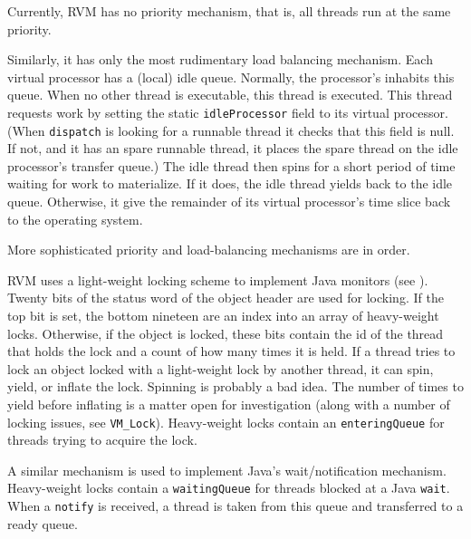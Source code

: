 Currently, RVM has no priority mechanism, that is, all threads run
at the same priority.

Similarly, it has only the most rudimentary load balancing mechanism.
Each virtual processor has a (local) idle queue.  Normally, the
processor's 
inhabits this queue.  When no other
thread is executable, this thread is executed.  This thread requests
work by setting the static {\tt idleProcessor} field to its virtual
processor.  (When {\tt dispatch} is looking for a runnable thread it
checks that this field is null.  If not, and it has an spare runnable
thread, it places the spare thread on the idle processor's transfer
queue.)  The idle thread then spins for a short period of time waiting
for work to materialize.  If it does, the idle thread yields back to
the idle queue.  Otherwise, it give the remainder of its virtual
processor's time slice back to the operating system.

More sophisticated priority and load-balancing mechanisms are in
order.

RVM uses a light-weight locking scheme to implement Java monitors (see
).  Twenty bits of the status word of the object header are
used for locking.  If the top bit is set, the bottom nineteen are an
index into an array of heavy-weight locks.  Otherwise, if the object
is locked, these bits contain the id of the thread that holds the lock
and a count of how many times it is held.  If a thread tries to lock
an object locked with a light-weight lock by another thread, it can
spin, yield, or inflate the lock.  Spinning is probably a bad idea.
The number of times to yield before inflating is a matter open for
investigation (along with a number of locking issues, see {\tt VM\_Lock}).
Heavy-weight locks contain an {\tt enteringQueue} for threads trying
to acquire the lock.

A similar mechanism is used to implement Java's wait/notification
mechanism.  Heavy-weight locks contain a {\tt waitingQueue} for
threads blocked at a Java {\tt wait}.  When a {\tt notify} is
received, a thread is taken from this queue and transferred to a ready
queue.

\JavaTMFooter